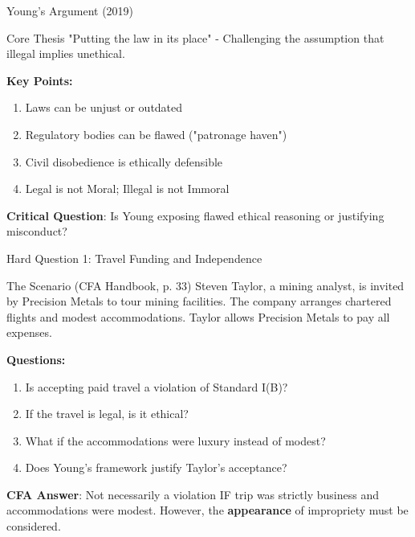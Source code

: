 \documentclass{beamer}
\begin{document}
	\begin{frame}{Young's Argument (2019)}
		\begin{block}{Core Thesis}
			"Putting the law in its place" - Challenging the assumption that illegal implies unethical.
		\end{block}
		
		\textbf{Key Points:}
		\begin{enumerate}
			\item Laws can be \textcolor{cfablue}{unjust} or \textcolor{cfablue}{outdated}
			\item Regulatory bodies can be flawed ("patronage haven")
			\item Civil disobedience is ethically defensible
			\item Legal is not Moral; Illegal is not Immoral
		\end{enumerate}
		
		\vspace{0.3cm}
		\textbf{Critical Question}: Is Young exposing flawed ethical reasoning or justifying misconduct?
	\end{frame}
	
	\begin{frame}{Hard Question 1: Travel Funding and Independence}
		\begin{block}{The Scenario (CFA Handbook, p. 33)}
			Steven Taylor, a mining analyst, is invited by Precision Metals to tour mining facilities. The company arranges chartered flights and modest accommodations. Taylor allows Precision Metals to pay all expenses.
		\end{block}
		
		\vspace{0.2cm}
		\textbf{Questions:}
		\begin{enumerate}
			\item Is accepting paid travel a violation of Standard I(B)?
			\item If the travel is legal, is it ethical?
			\item What if the accommodations were luxury instead of modest?
			\item Does Young's framework justify Taylor's acceptance?
		\end{enumerate}
		
		\vspace{0.2cm}
		\textcolor{cfablue}{\textbf{CFA Answer}}: Not necessarily a violation IF trip was strictly business and accommodations were modest. However, the \textbf{appearance} of impropriety must be considered.
	\end{frame}
	
\end{document}
